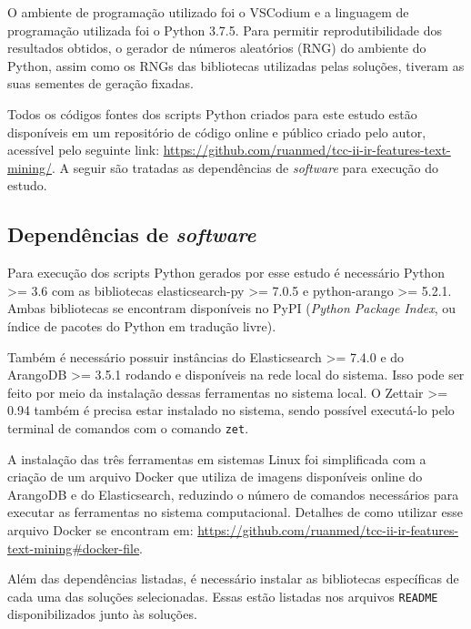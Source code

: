 		O ambiente de programação utilizado foi o VSCodium e a linguagem de programação utilizada foi o Python 3.7.5.
		Para permitir reprodutibilidade dos resultados obtidos, o gerador de números aleatórios (RNG) do ambiente do Python, assim como os RNGs das bibliotecas utilizadas pelas soluções, tiveram as suas sementes de geração fixadas.

		Todos os códigos fontes dos scripts Python criados para este estudo estão disponíveis em um repositório de código online e público criado pelo autor, acessível pelo seguinte link: \url{https://github.com/ruanmed/tcc-ii-ir-features-text-mining/}.
		A seguir são tratadas as dependências de \textit{software} para execução do estudo.

		\subsection{Dependências de \textit{software}} \label{subsec:DependênciasSoftware}
			Para execução dos scripts Python gerados por esse estudo é necessário Python >= 3.6 com as bibliotecas elasticsearch-py >= 7.0.5 e python-arango >= 5.2.1.
			Ambas bibliotecas se encontram disponíveis no PyPI (\textit{Python Package Index}, ou índice de pacotes do Python em tradução livre).

			Também é necessário possuir instâncias do Elasticsearch >= 7.4.0 e do ArangoDB >= 3.5.1 rodando e disponíveis na rede local do sistema.
			Isso pode ser feito por meio da instalação dessas ferramentas no sistema local.
			O Zettair >= 0.94 também é precisa estar instalado no sistema, sendo possível executá-lo pelo terminal de comandos com o comando \texttt{zet}.

			A instalação das três ferramentas em sistemas Linux foi simplificada com a criação de um arquivo Docker que utiliza de imagens disponíveis online do ArangoDB e do Elasticsearch, reduzindo o número de comandos necessários para executar as ferramentas no sistema computacional.
			Detalhes de como utilizar esse arquivo Docker se encontram em: \url{https://github.com/ruanmed/tcc-ii-ir-features-text-mining\#docker-file}.

			Além das dependências listadas, é necessário instalar as bibliotecas específicas de cada uma das soluções selecionadas.
			Essas estão listadas nos arquivos \texttt{README} disponibilizados junto às soluções.

